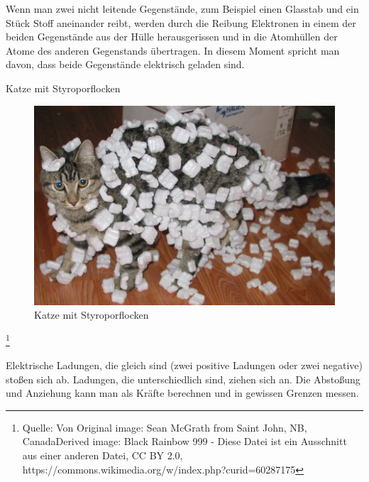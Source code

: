 \documentclass[a4paper, 10pt]{scrartcl}
\begin{document}
Wenn man zwei nicht leitende Gegenstände, zum Beispiel einen Glasstab und ein Stück Stoff aneinander reibt, werden durch die Reibung Elektronen in einem der beiden Gegenstände aus der Hülle herausgerissen und in die Atomhüllen der Atome des anderen Gegenstands übertragen. In diesem Moment spricht man davon, dass beide Gegenstände elektrisch geladen sind.
\begin{frame}{Katze mit Styroporflocken}
  \begin{figure}[htb]
    \includegraphics{Cat_demonstrating_static_cling_with_styrofoam_peanuts.jpeg}
    \caption{Katze mit Styroporflocken}
    \label{abb:CatWidthStyropor}
    \end{figure}
  \footnote{Quelle: Von Original image: Sean McGrath from Saint John, NB, CanadaDerived image: Black Rainbow 999 - Diese Datei ist ein Ausschnitt aus einer anderen Datei, CC BY 2.0, https://commons.wikimedia.org/w/index.php?curid=60287175}
\end{frame}


Elektrische Ladungen, die gleich sind (zwei positive Ladungen oder zwei negative) stoßen sich ab. Ladungen, die unterschiedlich sind, ziehen sich an. Die Abstoßung und Anziehung kann man als Kräfte berechnen und in gewissen Grenzen messen.
\end{document}
